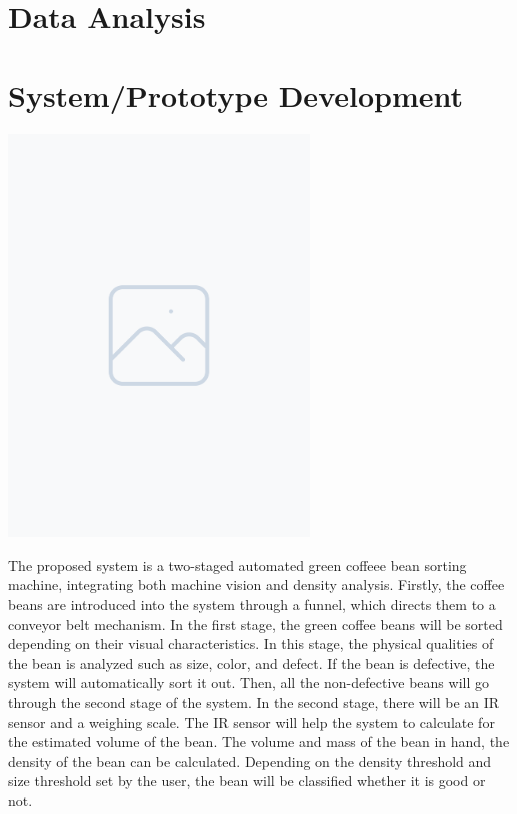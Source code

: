 \section{Data Analysis}

\section{System/Prototype Development}
\label{sec:implement}

\includegraphics[width=0.6\textwidth]{figure/placeholder.png} 

The proposed system is a two-staged automated green coffeee bean sorting machine, integrating both machine vision and density analysis. Firstly, the coffee beans are introduced into the system through a funnel, which directs them to a conveyor belt mechanism.  In the first stage, the green coffee beans will be sorted depending on their visual characteristics. In this stage, the physical qualities of the bean is analyzed such as size, color, and defect. If the bean is defective, the system will automatically sort it out. Then, all the non-defective beans will go through the second stage of the system. In the second stage, there will be an IR sensor and a weighing scale. The IR sensor will help the system to calculate for the estimated volume of the bean. The volume and mass of the bean in hand, the density of the bean can be calculated. Depending on the density threshold and size threshold set by the user, the bean will be classified whether it is good or not.

